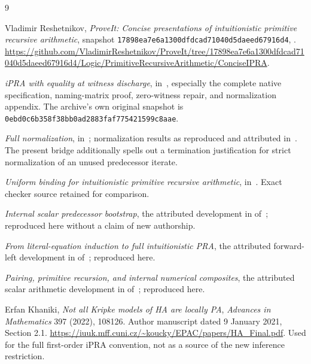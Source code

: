 \begin{thebibliography}{9}

Vladimir Reshetnikov, \emph{ProveIt: Concise presentations of intuitionistic
primitive recursive arithmetic}, snapshot
\texttt{17898ea7e6a1300dfdcad71040d5daeed67916d4},
.
\url{https://github.com/VladimirReshetnikov/ProveIt/tree/17898ea7e6a1300dfdcad71040d5daeed67916d4/Logic/PrimitiveRecursiveArithmetic/ConciseIPRA}.

\emph{iPRA with equality at witness discharge},
in~\cite{baseline}, especially the complete native specification,
naming-matrix proof, zero-witness repair, and normalization appendix.
The archive's own original snapshot is
\texttt{0ebd0c6b358f38bb0ad2883faf775421599c8aae}.

\emph{Full normalization}, 
in~\cite{baseline}; normalization results as reproduced and attributed
in~\cite{witness}. The present bridge additionally spells out a
termination justification for strict normalization of an unused
predecessor iterate.

\emph{Uniform binding for intuitionistic primitive recursive arithmetic},
in~\cite{baseline}. Exact checker source retained for comparison.

\emph{Internal scalar predecessor bootstrap}, the attributed development
in 
of~\cite{baseline}; reproduced here without a claim of new authorship.

\emph{From literal-equation induction to full intuitionistic PRA},
the attributed forward-left development in
of~\cite{baseline}; reproduced here.

\emph{Pairing, primitive recursion, and internal numerical composites},
the attributed scalar arithmetic development in
of~\cite{baseline}; reproduced here.

Erfan Khaniki, \emph{Not all Kripke models of HA are locally PA},
\emph{Advances in Mathematics} 397 (2022), 108126.
Author manuscript dated 9 January 2021, Section 2.1.
\url{https://iuuk.mff.cuni.cz/~koucky/EPAC/papers/HA_Final.pdf}.
Used for the full first-order iPRA convention, not as a source of the
new inference restriction.

\end{thebibliography}

